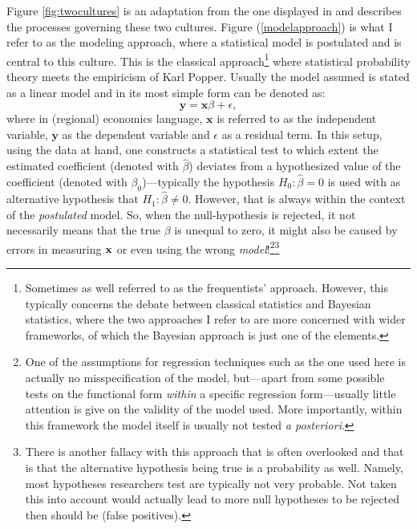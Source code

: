 \documentclass[fleqn,10pt]{SelfArx} %
\begin{document}
Figure \ref{fig:twocultures} is an adaptation from the one displayed in \citet{breiman2001statistical} and describes the processes governing these two cultures. Figure (\ref{modelapproach}) is what I refer to as the modeling approach, where a statistical model is postulated and is central to this culture. This is the classical approach\footnote{Sometimes as well referred to as the frequentists' approach. However, this typically concerns the debate between classical statistics and Bayesian statistics, where the two approaches I refer to are more concerned with wider frameworks, of which the Bayesian approach is just one of the elements.} where statistical probability theory meets the empiricism of Karl Popper. Usually the model assumed is stated as a linear model and in its most simple form can be denoted as:
\begin{equation}
	\mathbf{y} = \mathbf{x}\beta + \epsilon, 
\end{equation}
where in (regional) economics language, $\mathbf{x}$ is referred to as the
independent variable, $\mathbf{y}$ as the dependent variable and $\epsilon$ as a
residual term. In this setup, using the data at hand, one constructs a
statistical test to which extent the estimated coefficient (denoted with
$\hat{\beta}$) deviates from a hypothesized value of the coefficient (denoted
with $\beta_0$)---typically the hypothesis $H_0: \hat{\beta} = 0$ is used with
as alternative hypothesis that $H_1: \hat{\beta} \neq 0$. However, that is
always within the context of the \textit{postulated} model. So, when the
null-hypothesis is rejected, it not necessarily means that the true $\beta$ is
unequal to zero, it might also be caused by errors in measuring $\bf{x}$ or even
using the wrong \textit{model}!\footnote{One of the assumptions for regression
  techniques such as the one used here is actually no misspecification of the
  model, but---apart from some possible tests on the functional form
  \textit{within} a specific regression form---usually little attention is give
  on the validity of the model used. More importantly, within this framework the
  model itself is usually not tested \textit{a posteriori}.}\footnote{There is
  another fallacy with this approach that is often overlooked and that is that
  the alternative hypothesis being true is a probability as well. Namely,
most hypotheses researchers test are typically not very probable. Not taken this
into account would actually lead to more null hypotheses to be rejected then
should be (false positives).}
\end{document}
